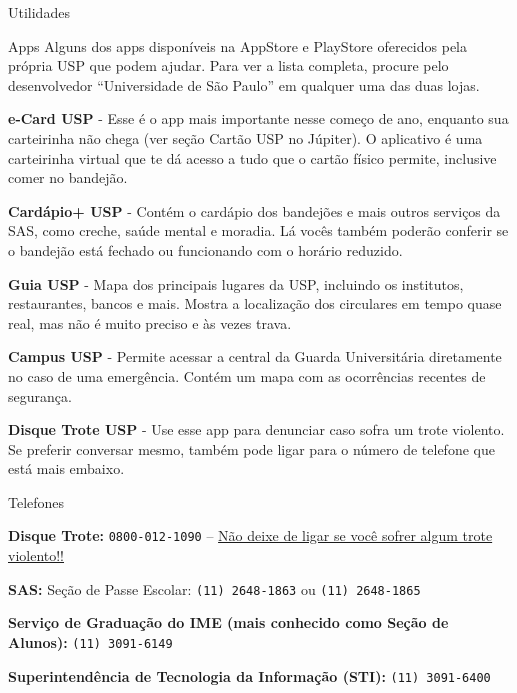 \begin{secao}{Utilidades}
\begin{subsecao}{Apps}
Alguns dos apps disponíveis na AppStore e PlayStore oferecidos pela própria USP
que podem ajudar. Para ver a lista completa, procure pelo desenvolvedor
``Universidade de São Paulo'' em qualquer uma das duas lojas.

{\bf e-Card USP} - Esse é o app mais importante nesse começo de ano, enquanto
sua carteirinha não chega (ver seção Cartão USP no Júpiter). O aplicativo é uma
carteirinha virtual que te dá acesso a tudo que o cartão físico permite,
inclusive comer no bandejão.

{\bf Cardápio+ USP} - Contém o cardápio dos bandejões e mais outros serviços
da SAS, como creche, saúde mental e moradia. Lá vocês também poderão conferir 
se o bandejão está fechado ou funcionando com o horário reduzido.

{\bf Guia USP} - Mapa dos principais lugares da USP, incluindo os institutos,
restaurantes, bancos e mais. Mostra a localização dos circulares em tempo quase
real, mas não é muito preciso e às vezes trava.

{\bf Campus USP} - Permite acessar a central da Guarda Universitária
diretamente no caso de uma emergência. Contém um mapa com as ocorrências
recentes de segurança.

{\bf Disque Trote USP} - Use esse app para denunciar caso sofra um trote
violento. Se preferir conversar mesmo, também pode ligar para o número de
telefone que está mais embaixo.

\end{subsecao}

\begin{subsecao}{Telefones}

{\bf Disque Trote:} {\tt 0800-012-1090} --
\underline{Não deixe de ligar se você sofrer algum trote violento!!}

{\bf SAS:} Seção de Passe Escolar: {\tt (11) 2648-1863} ou {\tt (11) 2648-1865}

{\bf Serviço de Graduação do IME (mais conhecido como Seção de Alunos):} {\tt (11) 3091-6149}

{\bf Superintendência de Tecnologia da Informação (STI):} {\tt (11) 3091-6400}


\end{subsecao}
\end{secao}
